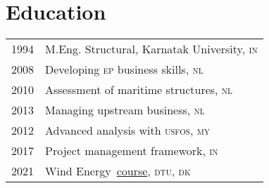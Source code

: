 \section*{Education} %
\label{sec:edu}

\begin{tabular}{l l}
  1994 & M.Eng. Structural, Karnatak University, \textsc{in} \\
  2008 & Developing \textsc{ep} business skills, \textsc{nl} \\
  2010 & Assessment of maritime structures, \textsc{nl} \\
  2013 & Managing upstream business, \textsc{nl} \\
  2012 & Advanced analysis with \textsc{usfos}, \textsc{my} \\
  2017 & Project management framework, \textsc{in} \\
  2021 & Wind Energy~\href{https://www.coursera.org/account/accomplishments/certificate/Y9CRZSXUSTWB}{course}, \textsc{dtu}, \textsc{dk} \\
\end{tabular}

